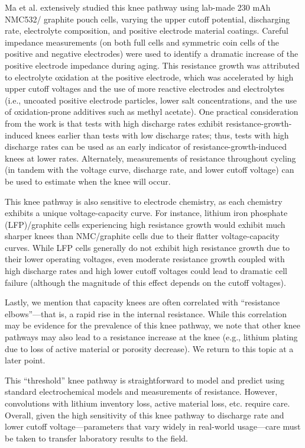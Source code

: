 \documentclass[journal=jpclcd,manuscript=article]{achemso}
\begin{document}
Ma et al.\cite{ma_editors_2019} extensively studied this knee pathway using lab-made 230 mAh NMC532/ graphite pouch cells, varying the upper cutoff potential, discharging rate, electrolyte composition, and positive electrode material coatings. Careful impedance measurements (on both full cells and symmetric coin cells of the positive and negative electrodes) were used to identify a dramatic increase of the positive electrode impedance during aging. This resistance growth was attributed to electrolyte oxidation at the positive electrode, which was accelerated by high upper cutoff voltages and the use of more reactive electrodes and electrolytes (i.e., uncoated positive electrode particles, lower salt concentrations, and the use of oxidation-prone additives such as methyl acetate). One practical consideration from the work\cite{ma_editors_2019} is that tests with high discharge rates exhibit resistance-growth-induced knees earlier than tests with low discharge rates; thus, tests with high discharge rates can be used as an early indicator of resistance-growth-induced knees at lower rates. Alternately, measurements of resistance throughout cycling (in tandem with the voltage curve, discharge rate, and lower cutoff voltage) can be used to estimate when the knee will occur.

This knee pathway is also sensitive to electrode chemistry, as each chemistry exhibits a unique voltage-capacity curve. For instance, lithium iron phosphate (LFP)/graphite cells experiencing high resistance growth would exhibit much sharper knees than NMC/graphite cells due to their flatter voltage-capacity curves. While LFP cells generally do not exhibit high resistance growth due to their lower operating voltages\cite{keil_calendar_2016, safari_aging_2011}, even moderate resistance growth coupled with high discharge rates and high lower cutoff voltages could lead to dramatic cell failure (although the magnitude of this effect depends on the cutoff voltages).

Lastly, we mention that capacity knees are often correlated with ``resistance elbows''---that is, a rapid rise in the internal resistance. While this correlation may be evidence for the prevalence of this knee pathway, we note that other knee pathways may also lead to a resistance increase at the knee (e.g., lithium plating due to loss of active material or porosity decrease). We return to this topic at a later point.

This ``threshold'' knee pathway is straightforward to model and predict using standard electrochemical models and measurements of resistance. However, convolutions with lithium inventory loss, active material loss, etc. require care. Overall, given the high sensitivity of this knee pathway to discharge rate and lower cutoff voltage---parameters that vary widely in real-world usage---care must be taken to transfer laboratory results to the field. 
\end{document}
